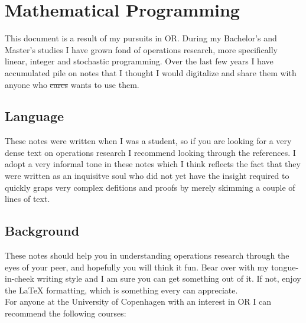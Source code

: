 \chapter{Mathematical Programming}
\localtableofcontents

This document is a result of my pursuits in OR. During my
Bachelor's and Master's studies I have grown fond of operations research, more
specifically linear, integer and stochastic programming. Over the last few years
I have accumulated pile on notes that I thought I would digitalize and share
them with anyone who \st{cares} wants to use them.\\

\section{Language}

These notes were written when I was a student, so if you are looking for a very
dense text on operations research I recommend looking through the references.
I adopt a very informal tone in these notes which I think reflects the fact that
they were written as an inquisitve soul who did not yet have the insight
required to quickly graps very complex defitions and proofs by merely skimming
a couple of lines of text.\\

\section{Background}


These notes should help you in understanding operations research
through the eyes of your peer, and hopefully you will think it fun. Bear over
with my tongue-in-cheek writing style and I am sure you can get something out
of it. If not, enjoy the {\LaTeX  } formatting, which is something every
can appreciate.\\

For anyone at the University of Copenhagen with an interest in OR I can 
recommend the following courses:

